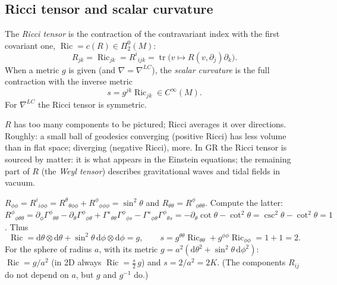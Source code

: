 \documentclass[11pt,a4paper]{article}
\numberwithin{equation}{section}
\theoremstyle{definition}
\theoremstyle{plain}
\newcommand{\dd}{\mathrm{d}}
\newcommand{\tr}{\operatorname{tr}}
\newcommand{\Ric}{\operatorname{Ric}}
\newcommand{\TF}[2]{\Pi^{#1}_{#2}}                  %
\begin{document}
\subsection{Ricci tensor and scalar curvature}
\begin{formal}
The \emph{Ricci tensor} is the contraction of the contravariant index with the first covariant one, $\Ric=c(R)\in\TF{0}{2}(M)$:
\[
R_{jk}=\Ric_{jk}=R^i{}_{ijk}=\tr\big(v\mapsto R(v,\partial_j)\partial_k\big).
\]
When a metric $g$ is given (and $\nabla=\nabla^{LC}$), the \emph{scalar curvature} is the full contraction with the inverse metric
\[
s=g^{jk}\Ric_{jk}\in C^\infty(M).
\]
For $\nabla^{LC}$ the Ricci tensor is symmetric.
\end{formal}
\begin{intuition}[{Ricci = ``how volumes of small balls differ from flat ones''}]
$R$ has too many components to be pictured; Ricci averages it over directions. Roughly: a small ball of geodesics converging (positive Ricci) has less volume than in flat space; diverging (negative Ricci), more. In GR the Ricci tensor is sourced by matter: it is what appears in the Einstein equations; the remaining part of $R$ (the \emph{Weyl tensor}) describes gravitational waves and tidal fields in vacuum.
\end{intuition}

\begin{example}
$R_{\phi\phi}=R^i{}_{i\phi\phi}=R^\theta{}_{\theta\phi\phi}+R^\phi{}_{\phi\phi\phi}=\sin^2\theta$ and $R_{\theta\theta}=R^\phi{}_{\phi\theta\theta}$. Compute the latter: $R^\phi{}_{\phi\theta\theta}=\partial_\phi\Gamma^\phi{}_{\theta\theta}-\partial_\theta\Gamma^\phi{}_{\phi\theta}+\Gamma^s{}_{\theta\theta}\Gamma^\phi{}_{\phi s}-\Gamma^s{}_{\phi\theta}\Gamma^\phi{}_{\theta s}=-\partial_\theta\cot\theta-\cot^2\theta=\csc^2\theta-\cot^2\theta=1$. Thus
\[
\Ric=\dd\theta\otimes\dd\theta+\sin^2\theta\,\dd\phi\otimes\dd\phi=g,\qquad s=g^{\theta\theta}\Ric_{\theta\theta}+g^{\phi\phi}\Ric_{\phi\phi}=1+1=2 .
\]
For the sphere of radius $a$, with its metric $g=a^2(\dd\theta^2+\sin^2\theta\,\dd\phi^2)$: $\Ric=g/a^2$ (in 2D always $\Ric=\tfrac s2\,g$) and $s=2/a^2=2K$. (The components $R_{ij}$ do not depend on $a$, but $g$ and $g^{-1}$ do.)
\end{example}
\end{document}
